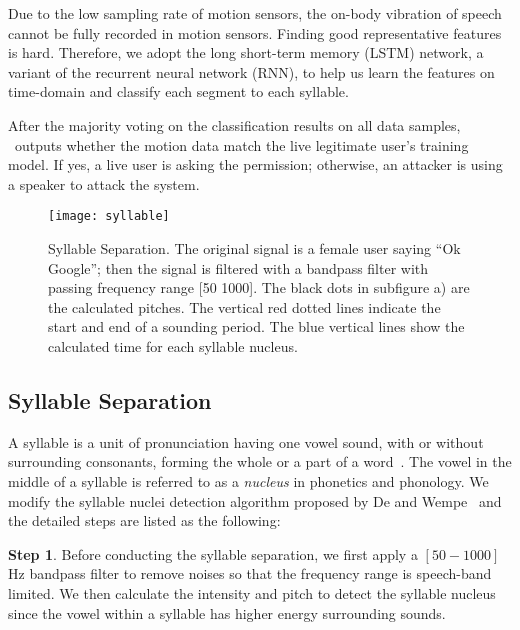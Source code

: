 Due to the low sampling rate of motion sensors, the on-body vibration of speech cannot be fully recorded in motion sensors. Finding good representative features is hard. Therefore, we adopt the long short-term memory (LSTM) network, a variant of the recurrent neural network (RNN), to help us learn the features on time-domain and classify each segment to each syllable. 

After the majority voting on the classification results on all data samples, \shortname~outputs whether the motion data match the live legitimate user's training model. If yes, a live user is asking the permission; otherwise, an attacker is using a speaker to attack the system. 


\begin{figure}[t]
	\centering
	\texttt{[image: syllable]}
	\caption[Syllable Separation]{Syllable Separation. The original signal is a female user saying ``Ok Google''; then the signal is filtered with a bandpass filter with passing frequency range [50 1000]. The black dots in subfigure a) are the calculated pitches. The vertical red dotted lines indicate the start and end of a sounding period. The blue vertical lines show the calculated time for each syllable nucleus.}
	\label{fig:syllable}
\end{figure}

\subsection{Syllable Separation}
A syllable is a unit of pronunciation having one vowel sound, with or without surrounding consonants, forming the whole or a part of a word~\cite{onlinesyllable}. The vowel in the middle of a syllable is referred to as a \textit{nucleus} in phonetics and phonology. We modify the syllable nuclei detection algorithm proposed by De and Wempe~\cite{de2009praat} and the detailed steps are listed as the following:


\textbf{Step 1}. 
Before conducting the syllable separation, we first apply a $\left[50-1000\right]$ Hz bandpass filter to remove noises so that the frequency range is speech-band limited. We then calculate the intensity and pitch to detect the syllable nucleus since the vowel within a syllable has higher energy surrounding sounds. 
%





